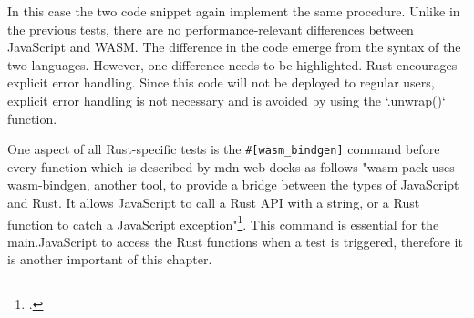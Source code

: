 In this case the two code snippet again implement the same procedure. Unlike in the previous tests, there are no performance-relevant differences between JavaScript and WASM. The difference in the code emerge from the syntax of the two languages. However, one difference needs to be highlighted. Rust encourages explicit error handling. Since this code will not be deployed to regular users, explicit error handling is not necessary and is avoided by using the `.unwrap()` function.

One aspect of all Rust-specific tests is the \texttt{\#[wasm\_bindgen]} command before every function which is described by mdn web docks as follows "wasm-pack uses wasm-bindgen, another tool, to provide a bridge between the types of JavaScript and Rust. It allows JavaScript to call a Rust API with a string, or a Rust function to catch a JavaScript exception"\footcite{mozilla_compiling_nodate}. This command is essential for the main.JavaScript to access the Rust functions when a test is triggered, therefore it is another important of this chapter. 